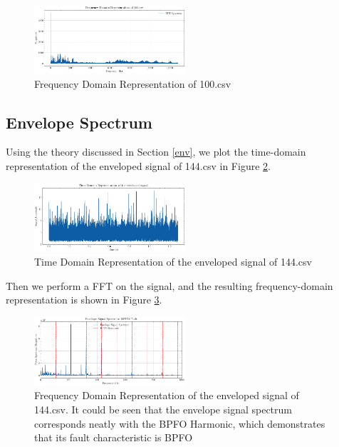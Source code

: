 \documentclass[conference]{IEEEtran}
\begin{document}
\begin{figure}[htbp]
    \centerline{\includegraphics[width=0.5\textwidth]{figure/fig_2.png}}
    \caption{Frequency Domain Representation of 100.csv}
    \label{fig_2}
\end{figure}

\subsection{Envelope Spectrum}

Using the theory discussed in Section \ref{env}, we plot the time-domain representation of the enveloped signal of 144.csv in Figure \ref{fig_3}.

\begin{figure}[htbp]
    \centerline{\includegraphics[width=0.5\textwidth]{figure/fig_3.png}}
    \caption{Time Domain Representation of the enveloped signal of 144.csv}
    \label{fig_3}
\end{figure}

Then we perform a FFT on the signal, and the resulting frequency-domain representation is shown in Figure \ref{fig_4}.

\begin{figure}[htbp]
    \centerline{\includegraphics[width=0.5\textwidth]{figure/fig_4.png}}
    \caption{Frequency Domain Representation of the enveloped signal of 144.csv. It could be seen that the envelope signal spectrum corresponds neatly with the BPFO Harmonic, which demonstrates that its fault characteristic is BPFO}
    \label{fig_4}
\end{figure}
\end{document}
